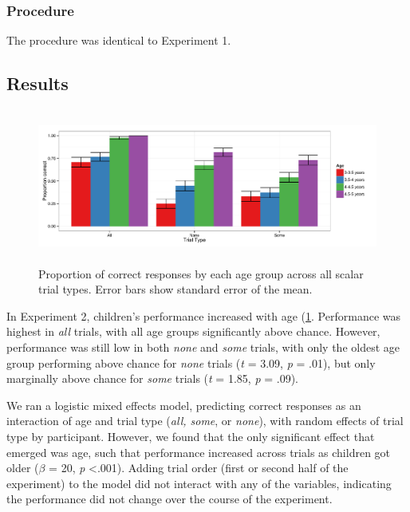 \documentclass[man]{apa2}
\begin{document}
\subsubsection{Procedure}
The procedure was identical to Experiment 1. 

\subsection{Results}

\begin{figure} 
 \begin{center} 
  \includegraphics[height=2in]{figures/exp2_performance.pdf} 
  \caption{\label{fig:exp2_perf} Proportion of correct responses by each age group across all scalar trial types. Error bars show standard error of the mean.} 
 \end{center} 
\end{figure}

In Experiment 2, children's performance increased with age (\ref{fig:exp2_perf}. Performance was highest in \textit{all} trials, with all age groups significantly above chance. However, performance was still low in both \textit{none} and \textit{some} trials, with only the oldest age group performing above chance for \textit{none} trials (\textit{t} = 3.09, \textit{p} = .01), but only marginally above chance for \textit{some} trials (\textit{t} = 1.85, \textit{p} = .09). 

We ran a logistic mixed effects model, predicting correct responses as an interaction of age and trial type (\textit{all, some}, or \textit{none}), with random effects of trial type by participant. However, we found that the only significant effect that emerged was age, such that performance increased across trials as children got older ($\beta$ = 20, \textit{p} \textless  .001). Adding trial order (first or second half of the experiment) to the model did not interact with any of the variables, indicating the performance did not change over the course of the experiment. 
\end{document}
